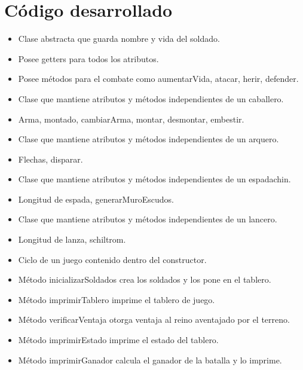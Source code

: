 \documentclass{article}
\begin{document}
\section{Código desarrollado}

\begin{itemize}
	\item Clase abstracta que guarda nombre y vida del soldado.
	\item Posee getters para todos los atributos.
	\item Posee métodos para el combate como aumentarVida, atacar, herir, defender.
\end{itemize}

\begin{itemize}
	\item Clase que mantiene atributos y métodos independientes de un caballero.
	\item Arma, montado, cambiarArma, montar, desmontar, embestir.
\end{itemize}

\begin{itemize}
	\item Clase que mantiene atributos y métodos independientes de un arquero.
	\item Flechas, disparar.
\end{itemize}

\begin{itemize}
	\item Clase que mantiene atributos y métodos independientes de un espadachin.
	\item Longitud de espada, generarMuroEscudos.
\end{itemize}

\begin{itemize}
	\item Clase que mantiene atributos y métodos independientes de un lancero.
	\item Longitud de lanza, schiltrom.
\end{itemize}

\begin{itemize}
	\item Ciclo de un juego contenido dentro del constructor.
	\item Método inicializarSoldados crea los soldados y los pone en el tablero.
	\item Método imprimirTablero imprime el tablero de juego.
	\item Método verificarVentaja otorga ventaja al reino aventajado por el terreno.
	\item Método imprimirEstado imprime el estado del tablero.
	\item Método imprimirGanador calcula el ganador de la batalla y lo imprime.
\end{itemize}
\end{document}
